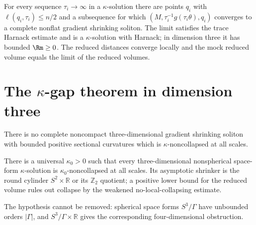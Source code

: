 \begin{theorem}
\label{thm:chow-iii-asymptotic-shrinker}
For every sequence $\tau_i\to\infty$ in a $\kappa$-solution there are points
$q_i$ with $\ell(q_i,\tau_i)\le n/2$ and a subsequence for which
$(M,\tau_i^{-1}g(\tau_i\theta),q_i)$ converges to a complete nonflat gradient
shrinking soliton.  The limit satisfies the trace Harnack estimate and is a
$\kappa$-solution with Harnack; in dimension three it has bounded
$\Rm\ge0$.  The reduced distances converge locally and the mock reduced volume
equals the limit of the reduced volumes.
\end{theorem}

\section{\texorpdfstring{The $\kappa$-gap theorem in dimension three}{The Kappa-gap theorem in dimension three}}

\begin{theorem}
\label{thm:chow-iii-no-3d-shrinker}
There is no complete noncompact three-dimensional gradient shrinking soliton
with bounded positive sectional curvatures which is $\kappa$-noncollapsed at
all scales.
\end{theorem}

\begin{theorem}
\label{thm:chow-iii-kappa-gap}
There is a universal $\kappa_0>0$ such that every three-dimensional
nonspherical space-form $\kappa$-solution is $\kappa_0$-noncollapsed at all
scales.  Its asymptotic shrinker is the round cylinder $S^2\times\mathbb R$
or its $\mathbb Z_2$ quotient; a positive lower bound for the reduced volume
rules out collapse by the weakened no-local-collapsing estimate.
\end{theorem}

\begin{remark}
\label{rem:chow-iii-kappa-gap-hypothesis}
The hypothesis cannot be removed: spherical space forms $S^3/\Gamma$ have
unbounded orders $|\Gamma|$, and $S^3/\Gamma\times\mathbb R$ gives the
corresponding four-dimensional obstruction.
\end{remark}
